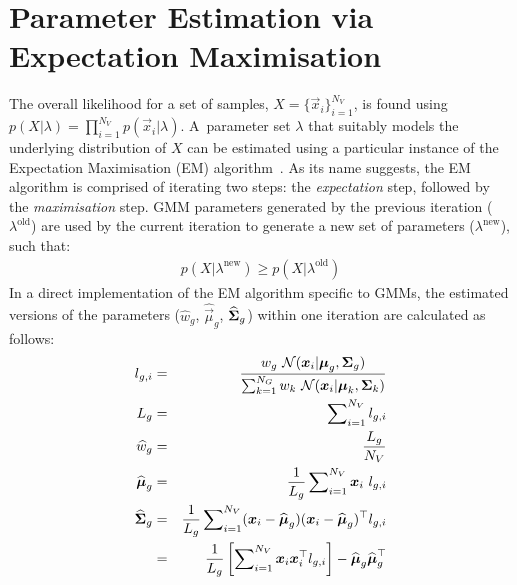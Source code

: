 \section{Parameter Estimation via Expectation Maximisation}
\label{sec:param_em}

\noindent
The overall likelihood for a set of samples, $X=\{\Vec{x}_i\}_{i=1}^{N_V}$,
is found using $p(X | \lambda) = \prod\nolimits_{i=1}^{N_V} p(\Vec{x}_i | \lambda)$.
A~parameter set $\lambda$ that suitably models the underlying distribution of $X$ can be estimated using a particular instance of the Expectation Maximisation (EM) algorithm~\cite{Dempster77, McLachlan-2008, Moon96, Redner84}.
As its name suggests, the EM algorithm is comprised of iterating two steps: the {\it expectation} step, followed by the {\it maximisation} step.
GMM parameters generated by the previous iteration ($\lambda^{\textrm{old}}$) are used
by the current iteration to generate a new set of parameters ($\lambda^{\textrm{new}}$), such that:
%
\begin{eqnarray}
	p(X|\lambda^{\textrm{new}}) \geq p(X|\lambda^{\textrm{old}})
\end{eqnarray}
%
In a direct implementation of the EM algorithm specific to GMMs,
the estimated versions of the parameters ($\widehat{w}_g$, $\widehat{\Vec{\mu}}_g$, $\widehat{{\boldsymbol{\Sigma}}}_g$)
within one iteration are calculated as follows:
%
\begin{eqnarray}
  l_{g,i}                  & = & \frac{w_g ~ {{\mathcal{N}}}( {\boldsymbol{x}}_i | {\boldsymbol{\mu}}_g, {\boldsymbol{\Sigma}}_g )}{\sum\nolimits_{k=1}^{N_G} w_k ~ {{\mathcal{N}}}( {\boldsymbol{x}}_i | {\boldsymbol{\mu}}_k, {\boldsymbol{\Sigma}}_k )} \label{eqn:aposteriori} \\
  L_g                      & = & \sum\nolimits_{i=1}^{N_V} l_{g,i} \\
  \widehat{w}_g            & = & \frac{L_g}{N_V}  \label{eqn:em_weight} \\
  \widehat{{\boldsymbol{\mu}}}_g    & = & \frac{1}{L_g} \sum\nolimits_{i=1}^{N_V} {\boldsymbol{x}}_i ~ l_{g,i}  \label{eqn:em_mean} \\
  \widehat{{\boldsymbol{\Sigma}}}_g & = & \frac{1}{L_g} \sum\nolimits_{i=1}^{N_V} ({\boldsymbol{x}}_i - \widehat{{\boldsymbol{\mu}}}_g)({\boldsymbol{x}}_i - \widehat{{\boldsymbol{\mu}}}_g)^\top l_{g,i} \label{eqn:em_cov} \\
                           & = &  \frac{1}{L_g} \left[ \sum\nolimits_{i=1}^{N_V} {\boldsymbol{x}}_i {\boldsymbol{x}}_i^\top l_{g,i} \right] - \widehat{{\boldsymbol{\mu}}}_g \widehat{{\boldsymbol{\mu}}}_g^\top
\end{eqnarray}

